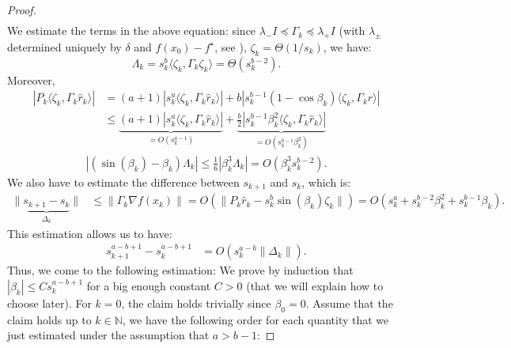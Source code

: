 \documentclass[10pt,a4paper]{amsart}
\newcommand*{\NN}{\mathbb{N}}
\newcommand{\innp}[2]{\langle #1, #2 \rangle}
\begin{document}
\begin{proof}
\begin{equation*}
\begin{aligned}
        \end{aligned}
    \end{equation*}
    We estimate the terms in the above equation: since $\lambda_- I \preceq \Gamma_k \preceq \lambda_+ I$ (with $\lambda_\pm$ determined uniquely by $\delta$ and $f(x_0) - f^\star$, see ), $\zeta_k = \Theta(1/s_k)$, we have:
    \begin{equation*}
        \Lambda_k = s_k^b \innp{\zeta_k}{\Gamma_k\zeta_k} = \Theta(s_k^{b - 2}).
    \end{equation*}
    Moreover,
    \begin{equation*}
        \begin{aligned}
            |P_k\innp{\zeta_k}{\Gamma_k\hat{r}_k}| &= (a+1)|s_k^{a} \innp{\zeta_k}{\Gamma_k\hat{r}_k}| + b|s_k^{b-1}(1 - \cos\beta_k) \innp{\zeta_k}{\Gamma_k\hat{r}}| \\
            &\leq \underbrace{(a+1)|s_k^{a} \innp{\zeta_k}{\Gamma_k\hat{r}_k}|}_{= O(s_k^{a - 1})} + \underbrace{\frac{b}{2}|s_k^{b-1}\beta_k^2 \innp{\zeta_k}{\Gamma_k\hat{r}_k}|}_{=O(s_k^{b - 1}\beta_k^2)}
        \end{aligned} 
    \end{equation*}
    \begin{equation*}
        \begin{aligned}
            |(\sin(\beta_k) - \beta_k)\Lambda_k| \leq \frac{1}{6}|\beta_k^3\Lambda_k| = O(\beta_k^3s_k^{b - 2}).
        \end{aligned}
    \end{equation*}
    We also have to estimate the difference between $s_{k + 1}$ and $s_k$, which is:
    \begin{equation*}
        \begin{aligned}
            \|\underbrace{s_{k + 1} - s_k}_{\Delta_k}\| &\leq \|\Gamma_k\nabla f(x_k)\| = O(\|P_k \hat{r}_k - s_k^b \sin (\beta_k) \zeta_k\|) = O(s_k^a + s_k^{b - 2}\beta_k^2 + s_k^{b - 1}\beta_k).
        \end{aligned}
    \end{equation*}
    This estimation allows us to have:
    \begin{equation*}
        \begin{aligned}
            s_{k+1}^{a - b + 1} - s_k^{a - b + 1} &= O(s_k^{a - b}\|\Delta_k\|).
        \end{aligned}
    \end{equation*}
    Thus, we come to the following estimation: We prove by induction that $|\beta_k| \leq Cs_k^{a - b + 1}$ for a big enough constant $C > 0$ (that we will explain how to choose later). For $k = 0$, the claim holds trivially since $\beta_0 = 0$. Assume that the claim holds up to $k \in \NN$, we have the following order for each quantity that we just estimated under the assumption that $a > b - 1$:

\end{proof}
\end{document}
